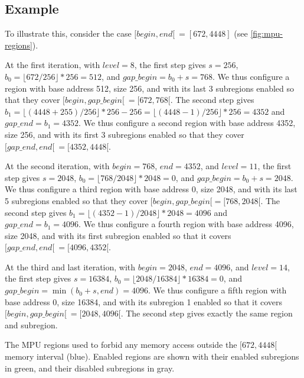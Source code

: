 \subsection{Example}

To illustrate this, consider the case
$[\mathit{begin},\mathit{end}[\ = [672,4448]$ (see \cref{fig:mpu-regions}).

At the first iteration, with $\mathit{level}=8$, the first step gives $s=256$,
$b_0 = \lfloor 672/256 \rfloor * 256 = 512$, and $\mathit{gap\_begin} = b_0 + s
= 768$. We thus configure a region with base address 512, size 256, and with
its last 3 subregions enabled so that they cover $[\mathit{begin},
\mathit{gap\_begin}[\ = [672,768[$. The second step gives $b_1 = \lfloor
(4448+255)/256 \rfloor * 256 - 256 = \lfloor (4448-1)/256 \rfloor * 256 = 4352$
and $\mathit{gap\_end} = b_1 = 4352$. We thus configure a second region with
base address 4352, size 256, and with its first 3 subregions enabled so that
they cover $[\mathit{gap\_end}, \mathit{end}[\ = [4352,4448[$.

At the second iteration, with $\mathit{begin}=768$, $\mathit{end}=4352$, and
$\mathit{level}=11$, the first step gives $s=2048$, $b_0 = \lfloor 768/2048
\rfloor * 2048 = 0$, and $\mathit{gap\_begin} = b_0 + s = 2048$. We thus
configure a third region with base address 0, size 2048, and with its last 5
subregions enabled so that they cover $[\mathit{begin}, \mathit{gap\_begin}[ =
[768,2048[$. The second step gives $b_1 = \lfloor (4352-1)/2048 \rfloor * 2048
= 4096$ and $\mathit{gap\_end}=b_1=4096$. We thus configure a fourth region
with base address 4096, size 2048, and with its first subregion enabled so that
it covers $[\mathit{gap\_end}, \mathit{end}[\ = [4096,4352[$.

At the third and last iteration, with $\mathit{begin}=2048$,
$\mathit{end}=4096$, and $\mathit{level}=14$, the first step gives $s=16384$,
$b_0 = \lfloor 2048/16384 \rfloor * 16384 = 0$, and $\mathit{gap\_begin} =
\min(b_0 + s, \mathit{end}) = 4096$. We thus configure a fifth region with base
address 0, size 16384, and with its subregion 1 enabled so that it covers
$[\mathit{begin}, \mathit{gap\_begin}[\ = [2048,4096[$. The second step gives
exactly the same region and subregion.

\begin{Figure}
  

  \caption{The MPU regions used to forbid any memory access outside the
  $[672,4448[$ memory interval (blue). Enabled regions are shown with their
  enabled subregions in green, and their disabled subregions in
  gray.}\label{fig:mpu-regions}
\end{Figure}

